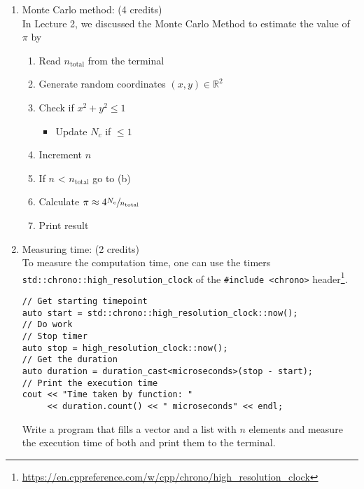 \documentclass[11pt]{article}
\begin{document}
\begin{enumerate}

\item Monte Carlo method: (4 credits)\\
In Lecture 2, we discussed the Monte Carlo Method to estimate the value of $\pi$ by
\begin{enumerate}
\item Read $n_{\text{total}}$ from the terminal
\item Generate random coordinates $(x,y)\in \mathbb{R}^2$
\item Check if $x^2+y^2 \leq 1$
\begin{itemize}
\item Update $N_c$ if $\leq 1$
\end{itemize}
\item Increment $n$ 
\item If $n$ < $n_{\text{total}}$ go to (b)
\item Calculate $\pi \approx 4 \sfrac{N_c}{n_\text{total}}$
\item Print result
\end{enumerate}

\item Measuring time: (2 credits)\\
To measure the computation time, one can use the timers \lstinline|std::chrono::high_resolution_clock| of the \lstinline|#include <chrono>| header\footnote{\url{https://en.cppreference.com/w/cpp/chrono/high_resolution_clock}}.
\begin{lstlisting}
// Get starting timepoint 
auto start = std::chrono::high_resolution_clock::now(); 
// Do work
// Stop timer
auto stop = high_resolution_clock::now();
// Get the duration
auto duration = duration_cast<microseconds>(stop - start); 
// Print the execution time  
cout << "Time taken by function: "
     << duration.count() << " microseconds" << endl; 
\end{lstlisting} 
Write a program that fills a vector and a list with $n$ elements and measure the execution time of both and print them to the terminal. 


\end{enumerate}

\doclicenseThis 
\end{document}
